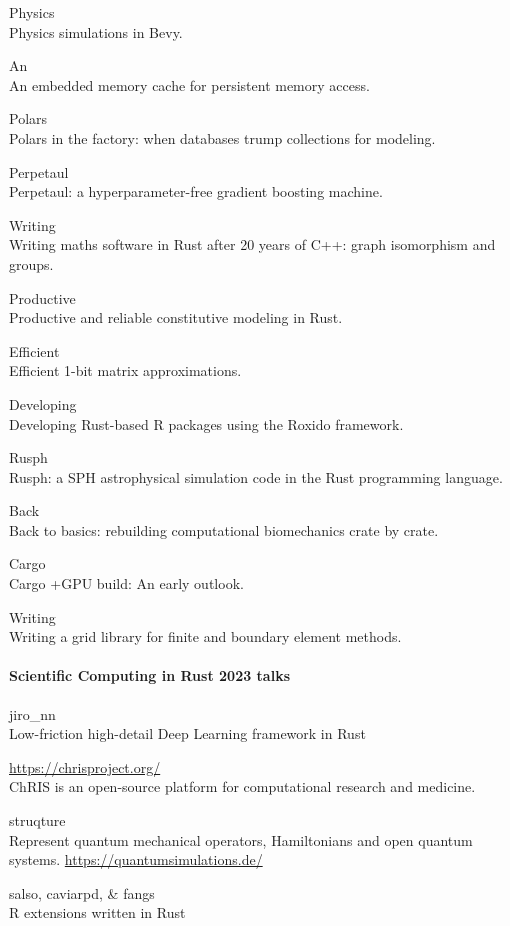 \documentclass{article}
\begin{document}
Physics\\
Physics simulations in Bevy.

An\\
An embedded memory cache for persistent memory access.

Polars\\
Polars in the factory: when databases trump collections for modeling.

Perpetaul\\
Perpetaul: a hyperparameter-free gradient boosting machine.

Writing\\
Writing maths software in Rust after 20 years of C++: graph isomorphism and groups.

Productive\\
Productive and reliable constitutive modeling in Rust.

Efficient\\
Efficient 1-bit matrix approximations.

Developing\\
Developing Rust-based R packages using the Roxido framework.

Rusph\\
Rusph: a SPH astrophysical simulation code in the Rust programming language.

Back\\
Back to basics: rebuilding computational biomechanics crate by crate.

Cargo\\
Cargo +GPU build: An early outlook.

Writing\\
Writing a grid library for finite and boundary element methods.

\paragraph{Scientific Computing in Rust 2023 talks}

jiro\_nn\\
Low-friction high-detail Deep Learning framework in Rust

\url{https://chrisproject.org/}\\
ChRIS is an open-source platform for computational research and medicine.

struqture\\
Represent quantum mechanical operators, Hamiltonians and open quantum systems.
\url{https://quantumsimulations.de/}

salso, caviarpd, \& fangs\\
R extensions written in Rust
\end{document}
